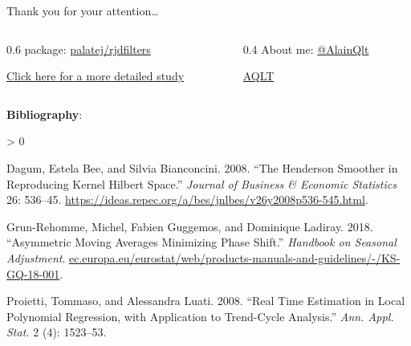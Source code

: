 \documentclass[10pt,xcolor=table,color={dvipsnames,usenames},ignorenonframetext,usepdftitle=false,english]{beamer}
\newlength{\cslhangindent}
\newenvironment{CSLReferences}[2] %
 {%
  \setlength{\parindent}{0pt}
  \ifodd #1 \everypar{\setlength{\hangindent}{\cslhangindent}}\ignorespaces\fi
  \ifnum #2 > 0
  \setlength{\parskip}{#2\baselineskip}
  \fi
 }%
 {}
\newcommand\1{\mathds{1}}
\begin{document}
\begin{frame}[noframenumbering]{Thank you for your attention\ldots{}}
\protect\hypertarget{thank-you-for-your-attention}{}
\begin{columns}
\begin{column}{0.6\textwidth} 
 package: \href{https://github.com/palatej/rjdfilters}{\faGithub{} palatej/rjdfilters}  

\href{https://aqlt.github.io/AsymmetricFilters/Stage_2A/_book/}{\bccrayon Click here for a more detailed study}
\end{column}
\begin{column}{0.4\textwidth}
About me: \href{https://twitter.com/AlainQlt}{\faTwitter{} @AlainQlt}

\href{https://github.com/AQLT}{\faGithub{} AQLT}  
\end{column}
\end{columns}

\textbf{Bibliography}:

\hypertarget{refs}{}
\begin{CSLReferences}{1}{0}
\leavevmode\hypertarget{ref-dagumbianconcini2008}{}%
Dagum, Estela Bee, and Silvia Bianconcini. 2008. {``{The Henderson
Smoother in Reproducing Kernel Hilbert Space}.''} \emph{Journal of
Business \& Economic Statistics} 26: 536--45.
\url{https://ideas.repec.org/a/bes/jnlbes/v26y2008p536-545.html}.

\leavevmode\hypertarget{ref-ch15HBSA}{}%
Grun-Rehomme, Michel, Fabien Guggemos, and Dominique Ladiray. 2018.
{``Asymmetric Moving Averages Minimizing Phase Shift.''} \emph{Handbook
on Seasonal Adjustment}.
\href{https://ec.europa.eu/eurostat/web/products-manuals-and-guidelines/-/KS-GQ-18-001}{ec.europa.eu/eurostat/web/products-manuals-and-guidelines/-/KS-GQ-18-001}.

\leavevmode\hypertarget{ref-proietti2008}{}%
Proietti, Tommaso, and Alessandra Luati. 2008. {``Real Time Estimation
in Local Polynomial Regression, with Application to Trend-Cycle
Analysis.''} \emph{Ann. Appl. Stat.} 2 (4): 1523--53.

\end{CSLReferences}
\end{frame}
\end{document}

